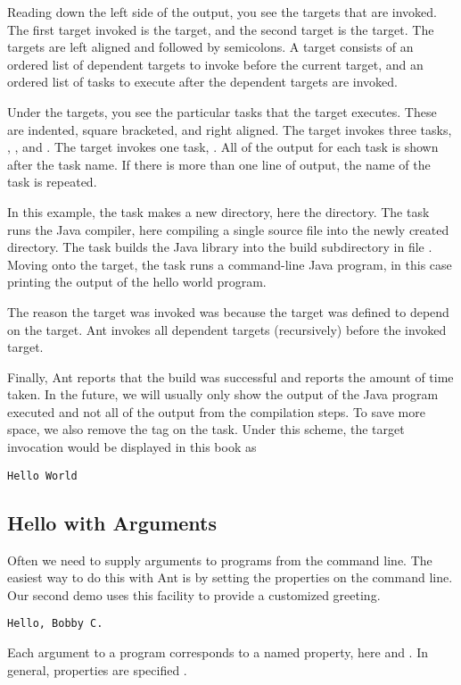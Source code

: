 Reading down the left side of the output, you see the targets that are
invoked.  The first target invoked is the  target, and the
second target is the  target.  The targets are left aligned
and followed by semicolons.  A target consists of an ordered list of
dependent targets to invoke before the current target, and an ordered
list of tasks to execute after the dependent targets are invoked.

Under the targets, you see the particular tasks that the target
executes.  These are indented, square bracketed, and right aligned.
The  target invokes three tasks, , ,
and .  The  target invokes one task, .
All of the output for each task is shown after the task name.  If
there is more than one line of output, the name of the task is
repeated.

In this example, the  task makes a new directory, here the 
 directory.  The  task runs the
Java compiler, here compiling a single source file into the
newly created directory.  The  task builds the Java
library into the build subdirectory  in file
.  Moving onto the  target,
the  task runs a command-line Java program, in this
case printing the output of the hello world program.

The reason the  target was invoked was because the
 target was defined to depend on the  target.
Ant invokes all dependent targets (recursively) before the invoked
target.

Finally, Ant reports that the build was successful and reports the
amount of time taken.  In the future, we will usually only show the
output of the Java program executed and not all of the output from the
compilation steps.  To save more space, we also remove the
\code{[java]} tag on the task.  Under this scheme, the 
target invocation would be displayed in this book as
%
\begin{verbatim}
Hello World
\end{verbatim}

\subsection{Hello with Arguments}

Often we need to supply arguments to programs from the command
line.  The easiest way to do this with Ant is by setting the
properties on the command line.  Our second demo uses this facility
to provide a customized greeting.
%
\begin{verbatim}
Hello, Bobby C.
\end{verbatim}
%
Each argument to a program corresponds to a named property, here
 and .  In general, properties are specified
.


